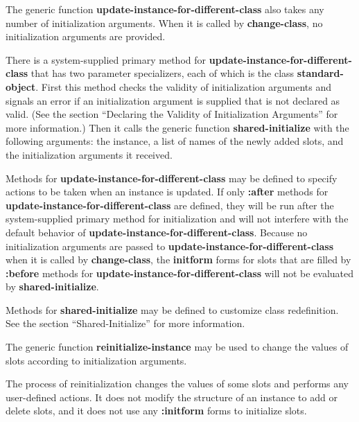 The generic function {\bf update-instance-for-different-class} also
takes any number of initialization arguments.  When it is called by
{\bf change-class}, no initialization arguments are provided.

There is a system-supplied primary method for {\bf
update-instance-for-different-class} that has two parameter
specializers, each of which is the class {\bf standard-object}.  First
this method checks the validity of initialization arguments and
signals an error if an initialization argument is supplied that is not
declared as valid.  (See the section ``Declaring the Validity of
Initialization Arguments'' for more information.)  Then it calls the
generic function {\bf shared-initialize} with the following arguments:
the instance, a list of names of the newly added slots, and the
initialization arguments it received.

\endsubSection%


Methods for {\bf update-instance-for-different-class} may be defined
to specify actions to be taken when an instance is updated.  If only
{\bf :after} methods for {\bf update-instance-for-different-class} are
defined, they will be run after the system-supplied primary method for
initialization and will not interfere with the default behavior of
{\bf update-instance-for-different-class}.  Because no initialization
arguments are passed to {\bf update-instance-for-different-class} when
it is called by {\bf change-class}, the {\bf initform} forms for slots
that are filled by {\bf :before} methods for {\bf
update-instance-for-different-class} will not be evaluated by {\bf
shared-initialize}.

Methods for {\bf shared-initialize} may be defined to customize class
redefinition.  See the section ``Shared-Initialize'' for more
information.

\endsubSection%

\endSection%


The generic function {\bf reinitialize-instance} may be used to change
the values of slots according to initialization arguments.

The process of reinitialization changes the values of some slots and
performs any user-defined actions.  It does not modify the structure
of an instance to add or delete slots, and it does not use any {\bf
:initform} forms to initialize slots.

